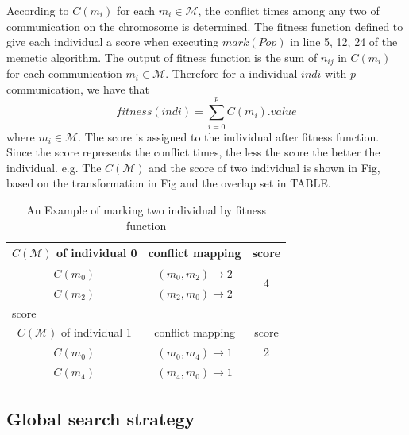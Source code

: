\documentclass[jornal]{IEEEtran}
\begin{document}
According to $C(m_{i})$ for each $m_{i}\in\mathcal{M}$, the conflict times among any two of communication on the chromosome is determined. The fitness function defined to give each individual a score when executing $mark(Pop)$ in line 5, 12, 24 of the memetic algorithm. The output of fitness function is the sum of $n_{ij}$ in $C(m_{i})$ for each communication $m_{i}\in\mathcal{M}$. Therefore for a individual $indi$ with $p$ communication, we have that
\begin{equation}
	fitness(indi)=\sum_{i=0}^p {C(m_i).value}
\end{equation}
where $m_i\in\mathcal{M}$. The score is assigned to the individual after fitness function. Since the score represents the conflict times, the less the score the better the individual. e.g. The $C(\mathcal{M})$ and the score of two individual is shown in Fig, based on the transformation in Fig and the overlap set in TABLE. 

\begin{table}[!t]
	\renewcommand{\arraystretch}{1.3}
	\caption{An Example of marking two individual by fitness function}
	\label{f:fitness}
	\centering
	\begin{tabular}{|c||c||c|}
		\hline
		$C(\mathcal{M})$ of individual 0 & conflict mapping & score\\
		\hline 
		$C(m_{0})$ & $ (m_0,m_2)\rightarrow 2$ & \multirow{2}{*}{4} \\
		\cline{1-2}  
		$C(m_{2})$ & $ (m_2,m_0)\rightarrow 2$ & \\
                \hline
                \multicolumn{3}{|l|}{score}\\
		\hline
			\hline
			$C(\mathcal{M})$ of individual 1 & conflict mapping & score\\
			\hline 
			$C(m_{0})$ & $ (m_0,m_4)\rightarrow 1$ & 2 \\
			\hline  
			$C(m_{4})$ & $ (m_4,m_0)\rightarrow 1$	&  \\
			\hline	
	\end{tabular}	

\end{table}

\subsection{Global search strategy}
\end{document}
